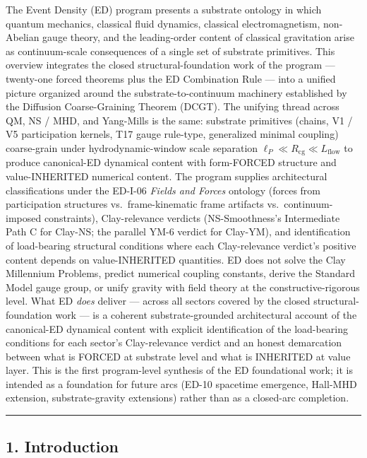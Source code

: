 \documentclass[
]{article}
\begin{document}
The Event Density (ED) program presents a substrate ontology in which
quantum mechanics, classical fluid dynamics, classical electromagnetism,
non-Abelian gauge theory, and the leading-order content of classical
gravitation arise as continuum-scale consequences of a single set of
substrate primitives. This overview integrates the closed
structural-foundation work of the program --- twenty-one forced theorems
plus the ED Combination Rule --- into a unified picture organized around
the substrate-to-continuum machinery established by the Diffusion
Coarse-Graining Theorem (DCGT). The unifying thread across QM, NS / MHD,
and Yang-Mills is the same: substrate primitives (chains, V1 / V5
participation kernels, T17 gauge rule-type, generalized minimal
coupling) coarse-grain under hydrodynamic-window scale separation
\(\ell_P \ll R_\mathrm{cg} \ll L_\mathrm{flow}\) to produce canonical-ED
dynamical content with form-FORCED structure and value-INHERITED
numerical content. The program supplies architectural classifications
under the ED-I-06 \emph{Fields and Forces} ontology (forces from
participation structures vs.~frame-kinematic frame artifacts
vs.~continuum-imposed constraints), Clay-relevance verdicts
(NS-Smoothness's Intermediate Path C for Clay-NS; the parallel YM-6
verdict for Clay-YM), and identification of load-bearing structural
conditions where each Clay-relevance verdict's positive content depends
on value-INHERITED quantities. ED does not solve the Clay Millennium
Problems, predict numerical coupling constants, derive the Standard
Model gauge group, or unify gravity with field theory at the
constructive-rigorous level. What ED \emph{does} deliver --- across all
sectors covered by the closed structural-foundation work --- is a
coherent substrate-grounded architectural account of the canonical-ED
dynamical content with explicit identification of the load-bearing
conditions for each sector's Clay-relevance verdict and an honest
demarcation between what is FORCED at substrate level and what is
INHERITED at value layer. This is the first program-level synthesis of
the ED foundational work; it is intended as a foundation for future arcs
(ED-10 spacetime emergence, Hall-MHD extension, substrate-gravity
extensions) rather than as a closed-arc completion.

\begin{center}\rule{0.5\linewidth}{0.5pt}\end{center}

\subsection{1. Introduction}\label{introduction}
\end{document}
